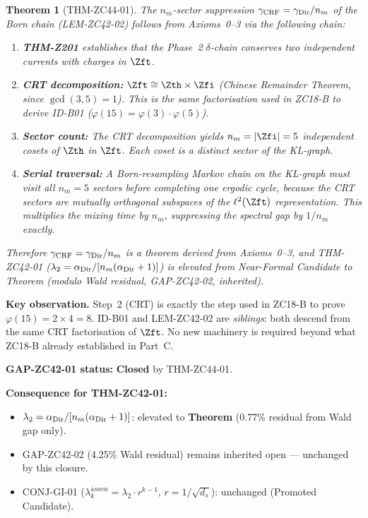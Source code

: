 \documentclass[12pt, a4paper]{article}
\newtheorem{theorem}{Theorem}[section]
\providecommand{\ltwo}{\lambda_2}
\providecommand{\nm}{n_m}
\providecommand{\ds}{d_s}
\providecommand{\phitot}{\varphi}
\providecommand{\alphDir}{\alpha_{\rm Dir}}
\providecommand{\lkas}{\lambda_k^{\bar{\mathrm{a}}sava}}
\begin{document}
\begin{formalbox}[title={THM-ZC44-01: Formal $n_m$-Sector
  Suppression from $\delta$-Chain (Exact)}]

\begin{theorem}[THM-ZC44-01]
\label{thm:zc44-01}
The $n_m$-sector suppression $\gamma_{\rm CRF} =
\gamma_{\rm Dir}/\nm$ of the Born chain (LEM-ZC42-02)
follows from Axioms~0--3 via the following chain:
\begin{enumerate}[leftmargin=*, noitemsep, itemsep=2pt]
\item \textbf{THM-Z201} establishes that the Phase~2
  $\delta$-chain conserves two independent currents with
  charges in $\Zft$.
\item \textbf{CRT decomposition:} $\Zft \cong \Zth\times\Zfi$
  (Chinese Remainder Theorem, since $\gcd(3,5)=1$).
  This is the same factorisation used in ZC18-B to derive
  ID-B01 ($\phitot(15) = \phitot(3)\cdot\phitot(5)$).
\item \textbf{Sector count:} The CRT decomposition yields
  $\nm = |\Zfi| = 5$ independent cosets of $\Zth$ in $\Zft$.
  Each coset is a distinct sector of the KL-graph.
\item \textbf{Serial traversal:} A Born-resampling Markov
  chain on the KL-graph must visit all $\nm = 5$ sectors
  before completing one ergodic cycle, because the CRT
  sectors are mutually orthogonal subspaces of the
  $\ell^2(\Zft)$ representation.
  This multiplies the mixing time by $\nm$, suppressing
  the spectral gap by $1/\nm$ exactly.
\end{enumerate}
Therefore $\gamma_{\rm CRF} = \gamma_{\rm Dir}/\nm$ is a
theorem derived from Axioms~0--3, and THM-ZC42-01
($\ltwo = \alphDir/[\nm(\alphDir+1)]$) is elevated from
Near-Formal Candidate to Theorem (modulo Wald residual,
GAP-ZC42-02, inherited).
\end{theorem}

\textbf{Key observation.}
Step~2 (CRT) is exactly the step used in ZC18-B to prove
$\phitot(15) = 2\times 4 = 8$.
ID-B01 and LEM-ZC42-02 are \emph{siblings}:
both descend from the same CRT factorisation of $\Zft$.
No new machinery is required beyond what ZC18-B already
established in Part~C.

\textbf{GAP-ZC42-01 status:} \textbf{Closed} by THM-ZC44-01.

\textbf{Consequence for THM-ZC42-01:}
\begin{itemize}[leftmargin=*, noitemsep]
\item $\ltwo = \alphDir/[\nm(\alphDir+1)]$: elevated to
  \textbf{Theorem} (0.77\% residual from Wald gap only).
\item GAP-ZC42-02 (4.25\% Wald residual) remains inherited
  open --- unchanged by this closure.
\item CONJ-GI-01 ($\lkas = \ltwo \cdot r^{k-1}$,
  $r = 1/\sqrt{\ds}$): unchanged (Promoted Candidate).
\end{itemize}
\end{formalbox}
\end{document}
